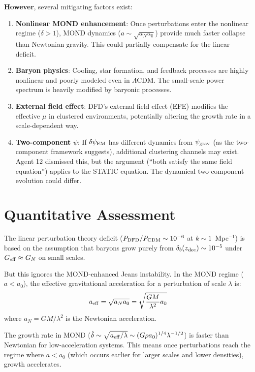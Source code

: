 \documentclass[11pt]{article}
\begin{document}
\textbf{However}, several mitigating factors exist:
\begin{enumerate}[nosep]
\item \textbf{Nonlinear MOND enhancement}: Once perturbations enter the
  nonlinear regime ($\delta > 1$), MOND dynamics ($a \sim \sqrt{a_N a_0}$)
  provide much faster collapse than Newtonian gravity. This could partially
  compensate for the linear deficit.
\item \textbf{Baryon physics}: Cooling, star formation, and feedback
  processes are highly nonlinear and poorly modeled even in $\Lambda$CDM.
  The small-scale power spectrum is heavily modified by baryonic processes.
\item \textbf{External field effect}: DFD's external field effect (EFE)
  modifies the effective $\mu$ in clustered environments, potentially
  altering the growth rate in a scale-dependent way.
\item \textbf{Two-component $\psi$}: If $\delta\psi_{\rm EM}$ has
  different dynamics from $\psi_{\rm grav}$ (as the two-component framework
  suggests), additional clustering channels may exist. Agent 12 dismissed
  this, but the argument (``both satisfy the same field equation'') applies
  to the STATIC equation. The dynamical two-component evolution could differ.
\end{enumerate}

\section{Quantitative Assessment}

The linear perturbation theory deficit ($P_{\rm DFD}/P_{\rm CDM} \sim 10^{-6}$
at $k \sim 1$~Mpc$^{-1}$) is based on the assumption that baryons grow
purely from $\delta_b(z_{\rm dec}) \sim 10^{-5}$ under $G_{\rm eff} \approx G_N$
on small scales.

But this ignores the MOND-enhanced Jeans instability. In the MOND regime
($a < a_0$), the effective gravitational acceleration for a perturbation
of scale $\lambda$ is:
\begin{equation}
a_{\rm eff} = \sqrt{a_N a_0} = \sqrt{\frac{G M}{\lambda^2} a_0}
\end{equation}
where $a_N = GM/\lambda^2$ is the Newtonian acceleration.

The growth rate in MOND ($\dot\delta \sim \sqrt{a_{\rm eff}/\lambda}
\sim (G\rho a_0)^{1/4}\lambda^{-1/2}$) is faster than Newtonian
for low-acceleration systems. This means once perturbations reach
the regime where $a < a_0$ (which occurs earlier for larger scales
and lower densities), growth accelerates.
\end{document}

